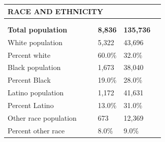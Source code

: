 \documentclass[9pt]{report}
\begin{document}
\vspace{12pt}
\setlength{\tabcolsep}{.01in} %
\begin{tabular}{p{.10in}p{.10in}p{.10in}p{3.7in}>{\hfill}p{.85in}>{\hfill}p{.85in}>{\hfill}p{.85in}>{\hfill}p{.85in}p{0.1in}}
\multicolumn{9}{l}{\parbox{7.1in}{\raggedright{\large{\strut\textbf{RACE AND ETHNICITY}\strut}}}} \\ 
\hline
\multicolumn{4}{l}{\parbox{3.5in}{\raggedright{\textbf{}}}} & \multicolumn{1}{r}{\parbox{.85in}{\strut\raggedleft{\textbf{}\strut}}} & \multicolumn{1}{r}{\parbox{.85in}{\strut\raggedleft{\textbf{}\strut}}} & \multicolumn{1}{r}{\parbox{.85in}{\strut{}}} & \multicolumn{1}{r}{\parbox{.85in}{\strut{}}} & \\ 
\multicolumn{9}{l}{} \\ 
\multicolumn{4}{l}{\parbox{3.5in}{\strut\raggedright{\textbf{Total population}\strut}}} & \textbf{} & \textbf{} & \textbf{8,836} & \textbf{135,736} & \textbf{} \\ 
\multicolumn{4}{l}{\parbox{3.6in}{\strut\raggedright{{White population}}\strut}} &  &  & 5,322 & 43,696 & \multicolumn{1}{l}{}  \\ 
\multicolumn{4}{l}{\parbox{3.6in}{\strut\raggedright{{Percent white}}\strut}} &  &  & 60.0\% & 32.0\% & \multicolumn{1}{l}{}  \\ 
\multicolumn{4}{l}{\parbox{3.6in}{\strut\raggedright{{Black population}}\strut}} &  &  & 1,673 & 38,040 & \multicolumn{1}{l}{}  \\ 
\multicolumn{4}{l}{\parbox{3.6in}{\strut\raggedright{{Percent Black}}\strut}} &  &  & 19.0\% & 28.0\% & \multicolumn{1}{l}{}  \\ 
\multicolumn{4}{l}{\parbox{3.6in}{\strut\raggedright{{Latino population}}\strut}} &  &  & 1,172 & 41,631 & \multicolumn{1}{l}{}  \\ 
\multicolumn{4}{l}{\parbox{3.6in}{\strut\raggedright{{Percent Latino}}\strut}} &  &  & 13.0\% & 31.0\% & \multicolumn{1}{l}{}  \\ 
\multicolumn{4}{l}{\parbox{3.6in}{\strut\raggedright{{Other race population}}\strut}} &  &  & 673 & 12,369 & \multicolumn{1}{l}{}  \\ 
\multicolumn{4}{l}{\parbox{3.6in}{\strut\raggedright{{Percent other race}}\strut}} &  &  & 8.0\% & 9.0\% & \multicolumn{1}{l}{}  \\ 

\end{tabular}
\setlength{\tabcolsep}{6pt} %
\end{document}
